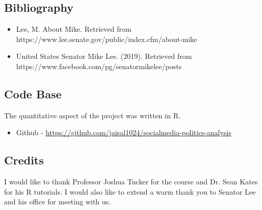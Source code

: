 \documentclass{article}
\begin{document}
\subsection{Bibliography}
\begin{itemize}
\item Lee, M. About Mike. Retrieved from https://www.lee.senate.gov/public/index.cfm/about-mike
\item United States Senator Mike Lee. (2019). Retrieved from https://www.facebook.com/pg/senatormikelee/posts
\end{itemize}

\subsection{Code Base}
\begin{flushleft}
 The quantitative aspect of the project was written in R. 
\begin{itemize}
\item Github -  \url{https://github.com/jaisal1024/socialmedia-politics-analysis}
\end{itemize}
\end{flushleft}

\subsection{Credits}
\begin{flushleft}
I would like to thank Professor Joshua Tucker for the course and Dr. Sean Kates for his R tutorials. I would also like to extend a warm thank you to Senator Lee and his office for meeting with us. 
\end{flushleft}
\end{document}
